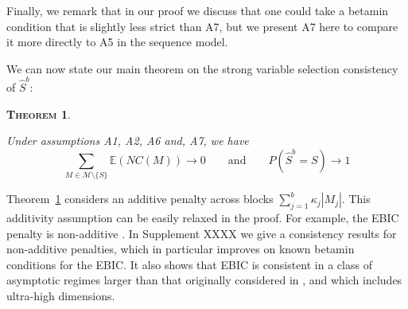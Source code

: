 \documentclass[aos]{imsart}
\theoremstyle{plain}
\newtheorem{thm}{\textsc{Theorem}}[section]
\newcommand{\E}{\mathbb{E}}
\newcommand{\M}{\mathcal{M}}
\begin{document}
Finally, we remark that in our proof we discuss that one could take a betamin condition that is slightly less strict than A7, but we present A7 here to compare it more directly to A5 in the sequence model.  

We can now state our main theorem on the strong variable selection consistency of $\hat{S}^{b}$:
\begin{thm}\label{theo:suffcondlinearmodel}

Under assumptions A1, A2, A6 and, A7, we have
$$\sum_{M \in \M\setminus \{S\}}\E\left(NC(M)\right)\to 0 \qquad \mbox{and} \qquad P(\hat{S}^b = S) \to 1$$
\end{thm}


Theorem~\ref{theo:suffcondlinearmodel} considers an additive penalty across blocks
$\sum_{j=1}^b \kappa_j|M_j|$. This additivity assumption can be easily relaxed in the proof. 
For example, the EBIC penalty is non-additive \citep{EBIC}.
In Supplement XXXX we give a consistency results for non-additive penalties, which in particular improves on known betamin conditions for the EBIC.
It also shows that EBIC is consistent in a class of asymptotic regimes larger than that originally considered in \cite{EBIC}, and which includes ultra-high dimensions.
\end{document}
